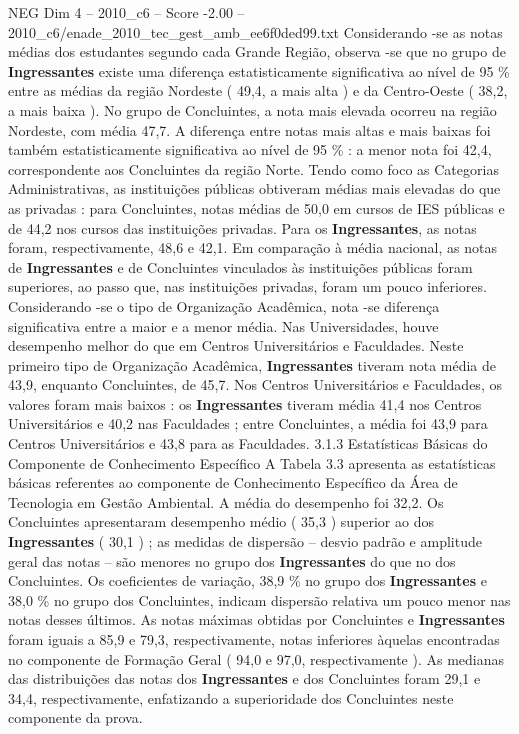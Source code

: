 \begin{textsample}{NEG Dim 4 – 2010\_c6 – Score -2.00 – 2010\_c6/enade\_2010\_tec\_gest\_amb\_ee6f0ded99.txt}
Considerando -se as notas médias dos estudantes segundo cada Grande Região, observa -se que no grupo de \textbf{Ingressantes} existe uma diferença estatisticamente significativa ao nível de 95 \% entre as médias da região Nordeste ( 49,4, a mais alta ) e da Centro-Oeste ( 38,2, a mais baixa ).
No grupo de Concluintes, a nota mais elevada ocorreu na região Nordeste, com média 47,7.
A diferença entre notas mais altas e mais baixas foi também estatisticamente significativa ao nível de 95 \% : a menor nota foi 42,4, correspondente aos Concluintes da região Norte.
Tendo como foco as Categorias Administrativas, as instituições públicas obtiveram médias mais elevadas do que as privadas : para Concluintes, notas médias de 50,0 em cursos de IES públicas e de 44,2 nos cursos das instituições privadas.
Para os \textbf{Ingressantes}, as notas foram, respectivamente, 48,6 e 42,1.
Em comparação à média nacional, as notas de \textbf{Ingressantes} e de Concluintes vinculados às instituições públicas foram superiores, ao passo que, nas instituições privadas, foram um pouco inferiores.
Considerando -se o tipo de Organização Acadêmica, nota -se diferença significativa entre a maior e a menor média.
Nas Universidades, houve desempenho melhor do que em Centros Universitários e Faculdades.
Neste primeiro tipo de Organização Acadêmica, \textbf{Ingressantes} tiveram nota média de 43,9, enquanto Concluintes, de 45,7.
Nos Centros Universitários e Faculdades, os valores foram mais baixos : os \textbf{Ingressantes} tiveram média 41,4 nos Centros Universitários e 40,2 nas Faculdades ; entre Concluintes, a média foi 43,9 para Centros Universitários e 43,8 para as Faculdades. 3.1.3 Estatísticas Básicas do Componente de Conhecimento Específico A Tabela 3.3 apresenta as estatísticas básicas referentes ao componente de Conhecimento Específico da Área de Tecnologia em Gestão Ambiental.
A média do desempenho foi 32,2.
Os Concluintes apresentaram desempenho médio ( 35,3 ) superior ao dos \textbf{Ingressantes} ( 30,1 ) ; as medidas de dispersão – desvio padrão e amplitude geral das notas – são menores no grupo dos \textbf{Ingressantes} do que no dos Concluintes.
Os coeficientes de variação, 38,9 \% no grupo dos \textbf{Ingressantes} e 38,0 \% no grupo dos Concluintes, indicam dispersão relativa um pouco menor nas notas desses últimos.
As notas máximas obtidas por Concluintes e \textbf{Ingressantes} foram iguais a 85,9 e 79,3, respectivamente, notas inferiores àquelas encontradas no componente de Formação Geral ( 94,0 e 97,0, respectivamente ).
As medianas das distribuições das notas dos \textbf{Ingressantes} e dos Concluintes foram 29,1 e 34,4, respectivamente, enfatizando a superioridade dos Concluintes neste componente da prova.

\end{textsample}
